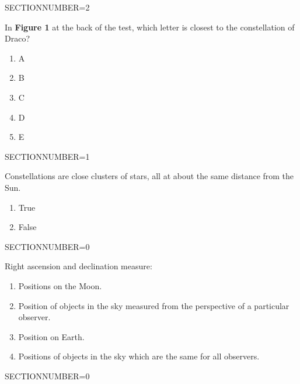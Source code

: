 \documentclass[11pt]{article}
\begin{document}
\begin{enumerate}
\begin{minipage}{\textwidth}
\begin{minipage}{\textwidth}
\end{minipage}
SECTIONNUMBER=2
\end{minipage}
\vskip 0.20in

\begin{minipage}{\textwidth}
\begin{minipage}{\textwidth}
\item In {\bf Figure 1} at the back of the test, which letter is closest to the constellation of Draco?
\begin{multicols}{3}
\begin{enumerate} 
\setlength{\itemsep}{1pt} 
\setlength{\parskip}{0pt} 
\setlength{\parsep}{0pt}
\setlength{\multicolsep}{1pt} 
\item A
\item B
\item C
\item D
\item E
\end{enumerate} 
\vfill 
\end{multicols}

\end{minipage}
SECTIONNUMBER=1
\end{minipage}
\vskip 0.20in

\begin{minipage}{\textwidth}
\begin{minipage}{\textwidth}
\item Constellations are close clusters of stars, all at about the same distance from the Sun.
\begin{multicols}{3}
\begin{enumerate} 
\setlength{\itemsep}{1pt} 
\setlength{\parskip}{0pt} 
\setlength{\parsep}{0pt}
\setlength{\multicolsep}{1pt} 
\item True
\item False
\end{enumerate} 
\vfill 
\end{multicols}

\end{minipage}
SECTIONNUMBER=0
\end{minipage}
\vskip 0.20in

\begin{minipage}{\textwidth}
\begin{minipage}{\textwidth}
\item Right ascension and declination measure:
\begin{enumerate} 
\setlength{\itemsep}{1pt} 
\setlength{\parskip}{0pt} 
\setlength{\parsep}{0pt}
\setlength{\multicolsep}{1pt} 
\item Positions on the Moon.
\item Position of objects in the sky measured from the perspective of a particular observer.
\item Position on Earth.
\item Positions of objects in the sky which are the same for all observers.
\end{enumerate} 
\end{minipage}
SECTIONNUMBER=0
\end{minipage}
\vskip 0.20in


\end{enumerate}
\end{document}
